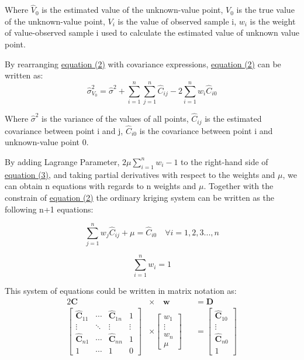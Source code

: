 \documentclass[a4paper, 12pt]{article} %
\begin{document}
\noindent Where $\widehat{V}_0$ is the estimated value of the unknown-value point, $V_0$ is the true value of the unknown-value point, $V_i$ is the value of observed sample i, $w_i$ is the weight of value-observed sample i used to calculate the estimated value of unknown value point.

By rearranging \hyperref[eq2]{equation (2)} with covariance expressions, \hyperref[eq2]{equation (2)} can be written as:
\begin{equation}
\label{eq3}
\widehat{\sigma}^2_{V_0} = \widehat{\sigma}^2 + \sum_{i=1}^n\sum_{j=1}^n \widehat{C}_{ij} - 2 \sum_{i=1}^n w_i \widehat{C}_{i0}
\end{equation}

\noindent Where $\widehat{\sigma}^2$ is the variance of the values of all points, $\widehat{C}_{ij}$ is the estimated covariance between point i and j, $\widehat{C}_{i0}$ is the covariance between point i and unknown-value point 0.

By adding Lagrange Parameter, $2\mu \sum_{i=1}^n w_i - 1$ to the right-hand side of \hyperref[eq3]{equation (3)}, and taking partial derivatives with respect to the weights and $\mu$, we can obtain n equations with regards to n weights and $\mu$. Together with the constrain of \hyperref[eq2]{equation (2)} the ordinary kriging system \citep{isaaks1989introduction} can be written as the following n+1 equations:

\begin{equation}
\label{eq4}
\sum_{j=1}^n w_j \widehat{C}_{ij} + \mu = \widehat{C}_{i0} \quad  \forall i = 1,2,3 ..., n
\end{equation}

\begin{equation}
\label{eq5}
\sum_{i=1}^n w_i = 1
\end{equation}

This system of equations \citep{isaaks1989introduction} could be written in matrix notation as:
\begin{alignat}{2}
 \boldsymbol{C} \quad  &\times \quad \boldsymbol{w} &&= \boldsymbol{D} \label{eq6} \\
\begin{bmatrix} 
\widehat{\boldsymbol{C}}_{11} & \cdots & \widehat{\boldsymbol{C}}_{1n} & 1\\
\vdots & \ddots & \vdots & \vdots \\
 \widehat{\boldsymbol{C}}_{n1} & \cdots & \widehat{\boldsymbol{C}}_{nn} & 1\\
 1 & \cdots & 1 & 0 
\end{bmatrix}
&\times
\begin{bmatrix} 
w_1  \\
\vdots \\
w_n \\
\mu 
\end{bmatrix}
&&=
\begin{bmatrix} 
\widehat{\boldsymbol{C}}_{10} \\
\vdots \\
\widehat{\boldsymbol{C}}_{n0} \\
1 
\label{eq7}
\end{bmatrix}
\end{alignat}
\end{document}
